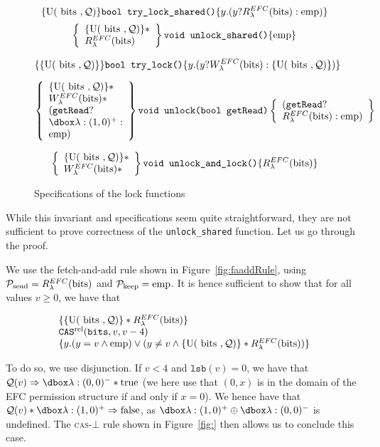 \begin{figure}
		$$\{\text{U}(\text { bits }, \mathcal{Q})\} \texttt{bool try\_lock\_shared()}\{y. (y ? R_{\lambda}^{EFC}(\text{bits}) : \mathrm{emp})\}$$
\[
\left\{\begin{array}{l}\{\text{U}(\text { bits }, \mathcal{Q})\}* \\ {R_{\lambda}^{EFC}(\text{bits})}\end{array}\right\}
\texttt{void unlock\_shared()} \{\mathrm{emp}\} \]


$$\{\{\text{U}(\text { bits }, \mathcal{Q})\}\}\texttt{bool try\_lock()} \{y. (y ? W_{\lambda}^{EFC}(\text{bits}) : \{\text{U}(\text { bits }, \mathcal{Q})\})\}$$


\[
\left\{\begin{array}{l}\Uperm* \\ \wPerm* \\ (\texttt{getRead} ? \\ \ghost{\lambda: (1, 0)^+} : \\ \emp) \end{array}\right\}
\texttt{void unlock(bool getRead)}
\left\{\begin{array}{l}(\texttt{getRead} ? \\ \rPerm : \emp) \end{array}\right\} \]

\[
\left\{\begin{array}{l}\{\text{U}(\text { bits }, \mathcal{Q})\}* \\ W_{\lambda}^{EFC}(\text{bits})* \end{array}\right\}
\texttt{void unlock\_and\_lock()}
\{R_{\lambda}^{EFC}(\text{bits})\} \]
\caption{Specifications of the lock functions}
\label{fig:specRWFolly}
\end{figure}

While this invariant and specifications seem quite straightforward, they are not sufficient to prove correctness of the \texttt{unlock\_shared} function. Let us go through the proof.

We use the fetch-and-add rule shown in Figure~\ref{fig:faaddRule}, using $\mathcal{P}_{\text{send}} = R_{\lambda}^{EFC}(\text{bits})$ and $\mathcal{P}_{\text{keep}} = \mathrm{emp}$. It is hence sufficient to show that for all values  $v \geq 0$, we have that 

\[
\begin{array}{l}
\{\{\text{U}(\text { bits }, \mathcal{Q})\} * R_{\lambda}^{EFC}(\text{bits})\} \\
\texttt{CAS}^{\text{rel}}(\texttt{bits}, v, v - 4) \\
\{y. (y = v \land \mathrm{emp}) \lor (y \neq v \land \{\text{U}(\text { bits }, \mathcal{Q})\} * R_{\lambda}^{EFC}(\text{bits}))\}
\end{array}\]

To do so, we use disjunction.
If $v < 4$ and $\texttt{lsb}(v) = 0$, we have that $\mathcal{Q}(v) \Rightarrow \efcm{0}{0} * \text{true}$ (we here use that $(0, x)$ is in the domain of the EFC permission structure if and only if $x = 0$). We hence have that $\mathcal{Q}(v) * \efcp{1}{0} \Rightarrow \text{false}$, as $\efcp{1}{0} \oplus \efcm{0}{0}$ is undefined. The \textsc{cas}-$\bot$ rule shown in Figure~\ref{fig:} then allows us to conclude this case.

